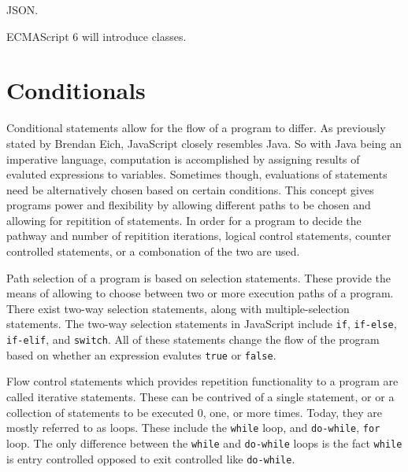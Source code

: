 \documentclass[man]{apa}
\begin{document}
JSON.

ECMAScript 6 will introduce classes.

\section{Conditionals}

Conditional statements allow for the flow of a program to differ. As previously stated by Brendan Eich, JavaScript closely resembles Java. So with Java being an imperative language, computation is accomplished by assigning results of evaluted expressions to variables. Sometimes though, evaluations of statements need be alternatively chosen based on certain conditions. This concept gives programs power and flexibility by allowing different paths to be chosen and allowing for repitition of statements. In order for a program to decide the pathway and number of repitition iterations, logical control statements, counter controlled statements, or a combonation of the two are used.

Path selection of a program is based on selection statements. These provide the means of allowing to choose between two or more execution paths of a program. There exist two-way selection statements, along with multiple-selection statements. The two-way selection statements in JavaScript include \texttt{if}, \texttt{if-else}, \texttt{if-elif}, and \texttt{switch}. All of these statements change the flow of the program based on whether an expression evalutes \texttt{true} or \texttt{false}.

Flow control statements which provides repetition functionality to a program are called iterative statements. These can be contrived of a single statement, or or a collection of statements to be executed 0, one, or more times. Today, they are mostly referred to as loops. These include the \texttt{while} loop, and \texttt{do-while}, \texttt{for} loop. The only difference between the \texttt{while} and \texttt{do-while} loops is the fact \texttt{while} is entry controlled opposed to exit controlled like \texttt{do-while}.
\end{document}

